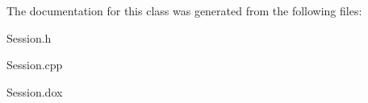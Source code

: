 The documentation for this class was generated from the following files\-:\begin{DoxyCompactItemize}
\item 
Session.\-h\item 
Session.\-cpp\item 
Session.\-dox\end{DoxyCompactItemize}
